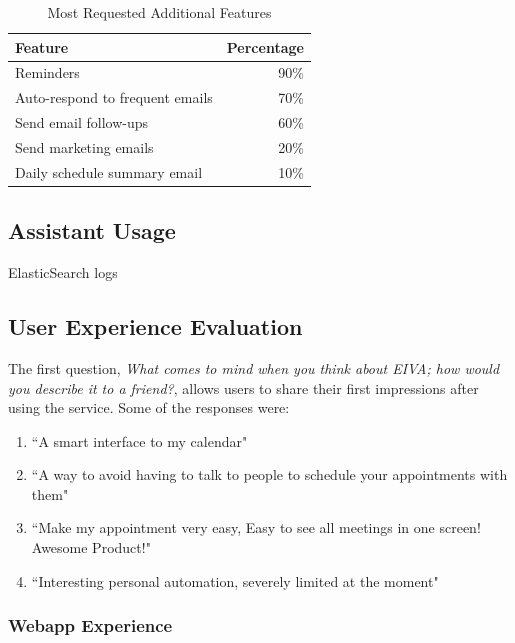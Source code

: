 \documentclass{article}
\begin{document}
\begin{table}[!htb]
    \begin{minipage}{1\linewidth}
   	 \caption{Most Requested Additional Features}
      \centering
        \begin{tabular}{lr}
	        \hline
            \textbf{Feature} & \textbf{Percentage} \\
            \hline
            Reminders & 90\% \\
            Auto-respond to frequent emails & 70\% \\
            Send email follow-ups & 60\% \\
            Send marketing emails & 20\% \\
            Daily schedule summary email & 10\% \\
            \hline
        \end{tabular}
    \end{minipage}%
\end{table}

\subsection{Assistant Usage}

ElasticSearch logs

\subsection{User Experience Evaluation}

The first question, \emph{What comes to mind when you think about EIVA; how would you describe it to a friend?}, allows users to share their first impressions after using the service. Some of the responses were:

\begin{enumerate}
	\item ``A smart interface to my calendar"
	\item ``A way to avoid having to talk to people to schedule your appointments with them"
	\item ``Make my appointment very easy, Easy to see all meetings in one screen! Awesome Product!"
	\item ``Interesting personal automation, severely limited at the moment"
\end{enumerate}

\subsubsection{Webapp Experience}
\end{document}
